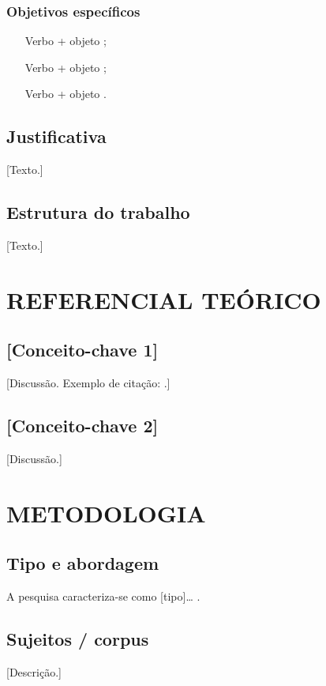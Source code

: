 \documentclass[
    12pt,                       %
    openright,                  %
    twoside,                    %
    a4paper,                    %
    chapter=TITLE,              %
    sumario=tradicional,        %
    section=TITLE,
    english,                    %
    spanish,                    %
    brazil                      %
]{abntex2}
\begin{document}
\subsection{Objetivos específicos}
\begin{enumerate}[label=\alph*)]
\item [Verbo + objeto];
\item [Verbo + objeto];
\item [Verbo + objeto].
\end{enumerate}

\section{Justificativa}
[Texto.]

\section{Estrutura do trabalho}
[Texto.]

\chapter{REFERENCIAL TEÓRICO}
\label{cap:teorico}

\section{[Conceito-chave 1]}
[Discussão. Exemplo de citação: \cite{minayo2014}.]

\section{[Conceito-chave 2]}
[Discussão.]

\chapter{METODOLOGIA}
\label{cap:metodo}

\section{Tipo e abordagem}
A pesquisa caracteriza-se como [tipo]\dots
{}.

\section{Sujeitos / corpus}
[Descrição.]
\end{document}
